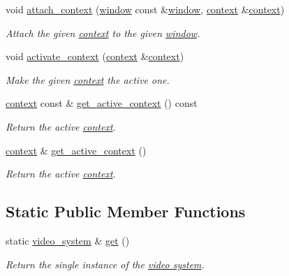 \begin{DoxyCompactItemize}
void \hyperlink{classgfx_1_1video__system_ac7264db27125bc83be5b5c8a24dfbd2d}{attach\-\_\-context} (\hyperlink{classgfx_1_1window}{window} const \&\hyperlink{classgfx_1_1window}{window}, \hyperlink{classgfx_1_1context}{context} \&\hyperlink{classgfx_1_1context}{context})
\begin{DoxyCompactList}\small\item\em Attach the given \hyperlink{classgfx_1_1context}{context} to the given \hyperlink{classgfx_1_1window}{window}. \end{DoxyCompactList}\item 
void \hyperlink{classgfx_1_1video__system_a73bd8fb31c02d2cad522de13afe065d6}{activate\-\_\-context} (\hyperlink{classgfx_1_1context}{context} \&\hyperlink{classgfx_1_1context}{context})
\begin{DoxyCompactList}\small\item\em Make the given \hyperlink{classgfx_1_1context}{context} the active one. \end{DoxyCompactList}\item 
\hyperlink{classgfx_1_1context}{context} const \& \hyperlink{classgfx_1_1video__system_a7aba62babe3d0ed8ccf92a8c9460926a}{get\-\_\-active\-\_\-context} () const 
\begin{DoxyCompactList}\small\item\em Return the active \hyperlink{classgfx_1_1context}{context}. \end{DoxyCompactList}\item 
\hyperlink{classgfx_1_1context}{context} \& \hyperlink{classgfx_1_1video__system_a7bf0d807b0916d639312f5c70fcf0dd5}{get\-\_\-active\-\_\-context} ()
\begin{DoxyCompactList}\small\item\em Return the active \hyperlink{classgfx_1_1context}{context}. \end{DoxyCompactList}\end{DoxyCompactItemize}
\subsection*{Static Public Member Functions}
\begin{DoxyCompactItemize}
\item 
static \hyperlink{classgfx_1_1video__system}{video\-\_\-system} \& \hyperlink{classgfx_1_1video__system_ae043b0959919df827446a8804156bb24}{get} ()
\begin{DoxyCompactList}\small\item\em Return the single instance of the \hyperlink{classgfx_1_1video__system}{video system}. \end{DoxyCompactList}\end{DoxyCompactItemize}
